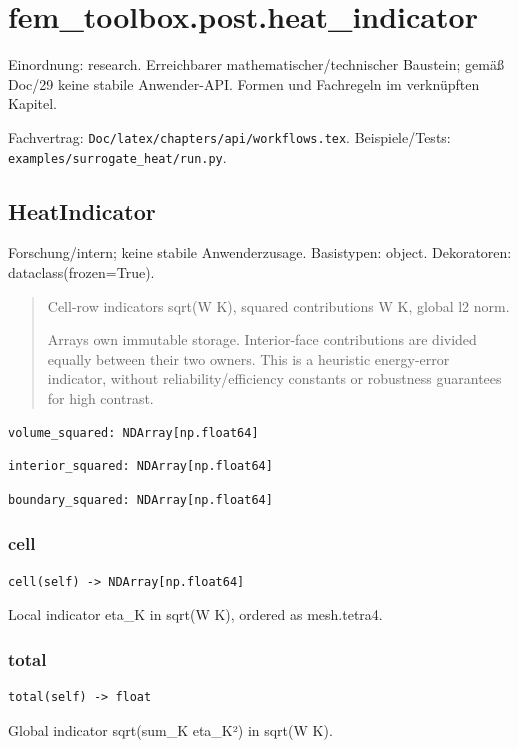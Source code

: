 \section{fem\_toolbox.post.heat\_indicator}
Einordnung: research. Erreichbarer mathematischer/technischer Baustein; gemäß Doc/29 keine stabile Anwender-API. Formen und Fachregeln im verknüpften Kapitel.
\par Fachvertrag: \nolinkurl{Doc/latex/chapters/api/workflows.tex}. Beispiele/Tests:
\nolinkurl{examples/surrogate_heat/run.py}.
\subsection{HeatIndicator}
Forschung/intern; keine stabile Anwenderzusage.
Basistypen: object. Dekoratoren: dataclass(frozen=True).
\begin{quote}
Cell-row indicators sqrt(W K), squared contributions W K, global l2 norm.\par Arrays own immutable storage. Interior-face contributions are divided equally between their two owners. This is a heuristic energy-error indicator, without reliability/efficiency constants or robustness guarantees for high contrast.
\end{quote}
\begin{lstlisting}
volume_squared: NDArray[np.float64]
\end{lstlisting}
\begin{lstlisting}
interior_squared: NDArray[np.float64]
\end{lstlisting}
\begin{lstlisting}
boundary_squared: NDArray[np.float64]
\end{lstlisting}
\subsubsection*{cell}
\begin{lstlisting}
cell(self) -> NDArray[np.float64]
\end{lstlisting}
Local indicator eta\_K in sqrt(W K), ordered as mesh.tetra4.
\subsubsection*{total}
\begin{lstlisting}
total(self) -> float
\end{lstlisting}
Global indicator sqrt(sum\_K eta\_K²) in sqrt(W K).
